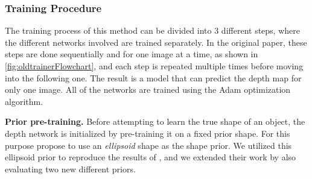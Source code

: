 \subsubsection{Training Procedure}
\label{sec:train}
The training process of this method can be divided into 3 different steps, where the different networks involved are trained separately. In the original paper, these steps are done sequentially and for one image at a time, as shown in \autoref{fig:oldtrainerFlowchart}, and each step is repeated multiple times before moving into the following one. The result is a model that can predict the depth map for only one image. All of the networks are trained using the Adam optimization algorithm.

\textbf{Prior pre-training.} Before attempting to learn the true shape of an object, the depth network is initialized by pre-training it on a fixed prior shape. 
For this purpose \textcite{gan2shape} propose to use an \textit{ellipsoid} shape as the shape prior. 
We utilized this ellipsoid prior to reproduce the results of \textcite{gan2shape}, and we extended their work by also evaluating two new different priors. 


